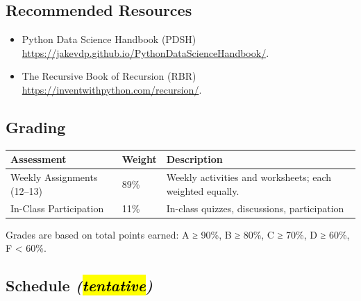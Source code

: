 \documentclass[10pt]{article}
\renewcommand{\arraystretch}{.9}
\begin{document}
\subsection*{Recommended Resources}
\begin{itemize}[leftmargin=*,nosep]
\item {Python Data Science Handbook (PDSH)} \url{https://jakevdp.github.io/PythonDataScienceHandbook/}.
\item {The Recursive Book of Recursion (RBR)} \url{https://inventwithpython.com/recursion/}.
\end{itemize}

\subsection*{Grading}
\renewcommand{\arraystretch}{1.025}
\begin{tabular}{l l l}
\hline
\textbf{Assessment}         & \textbf{Weight} & \textbf{Description} \\
\hline
Weekly Assignments (12--13) & 89\%            & Weekly activities and worksheets; each weighted equally. \\ \hline
In-Class Participation      & 11\%            & In-class quizzes, discussions, participation \\
\hline
\end{tabular}

\vspace{0pt}

{\footnotesize
\renewcommand{\arraystretch}{.9}
Grades are based on total points earned: A ≥ 90\%, B ≥ 80\%, C ≥ 70\%, D ≥ 60\%, F < 60\%.
}

\subsection*{Schedule \emph{(\hl{tentative})}}
\end{document}
